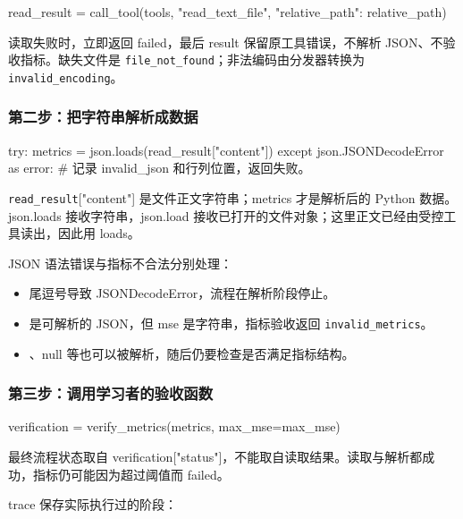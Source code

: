 \begin{Code}
read_result = call_tool(tools, "read_text_file", {"relative_path": relative_path})
\end{Code}

读取失败时，立即返回 failed，最后 result 保留原工具错误，不解析 JSON、不验收指标。缺失文件是 \nolinkurl{file_not_found}；非法编码由分发器转换为 \nolinkurl{invalid_encoding}。

\subsubsection{第二步：把字符串解析成数据}

\begin{Code}
try:
    metrics = json.loads(read_result["content"])
except json.JSONDecodeError as error:
    # 记录 invalid_json 和行列位置，返回失败。
\end{Code}

\nolinkurl{read_result}["content"] 是文件正文字符串；metrics 才是解析后的 Python 数据。json.loads 接收字符串，json.load 接收已打开的文件对象；这里正文已经由受控工具读出，因此用 loads。

JSON 语法错误与指标不合法分别处理：

\begin{itemize}
\item {} 尾逗号导致 JSONDecodeError，流程在解析阶段停止。
\item {} 是可解析的 JSON，但 mse 是字符串，指标验收返回 \nolinkurl{invalid_metrics}。
\item \code{[]}、null 等也可以被解析，随后仍要检查是否满足指标结构。
\end{itemize}

\subsubsection{第三步：调用学习者的验收函数}

\begin{Code}
verification = verify_metrics(metrics, max_mse=max_mse)
\end{Code}

最终流程状态取自 verification["status"]，不能取自读取结果。读取与解析都成功，指标仍可能因为超过阈值而 failed。

trace 保存实际执行过的阶段：

